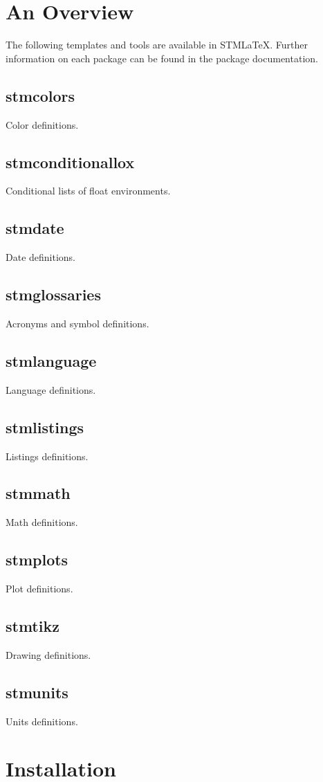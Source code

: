 \documentclass{scrartcl}
\author{Martin R\"{a}del}
\title{\stmlatex}
\subtitle{%
Overview and Installation Guide\\
Copyright \copyright{} \the\year{} DLR FA STM\\v\formatdate[versiondatestyle]{\DTMToday}\\
{\bigskip\small\normalfont Thankfully inspired by the RM-\LaTeX package guide.}
}
\date{\today}
\newcommand{\package}[1]{\subsection*{#1}\par\medskip\noindent\ignorespaces}
\newcommand{\stmlatex}{STM\LaTeX\xspace}
\begin{document}
\maketitle


\begin{abstract}
\stmlatex is a template collection for \LaTeX{} documents. All features and templates are created due to personal interest and are subject to change. All packages are tested using MiKTeX 2.9. However, they are considered as \enquote{as-is} and without any warranty. For questions, suggestion and feedback, please contact the author of the particular package.

\begin{center}
\color{red}
\bfseries
\stmlatex requires an up to date \LaTeX{} installation.
\end{center}
\end{abstract}


\tableofcontents


\section{An Overview}

The following templates and tools are available in \stmlatex. Further information on each package can be found in the package documentation.

\package{stmcolors}
Color definitions.

\package{stmconditionallox}
Conditional lists of float environments.

\package{stmdate}
Date definitions.

\package{stmglossaries}
Acronyms and symbol definitions.

\package{stmlanguage}
Language definitions.

\package{stmlistings}
Listings definitions.

\package{stmmath}
Math definitions.

\package{stmplots}
Plot definitions.

\package{stmtikz}
Drawing definitions.

\package{stmunits}
Units definitions.

\section{Installation}
\end{document}
